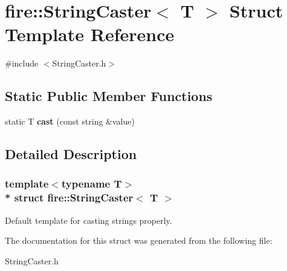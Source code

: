 \hypertarget{a00029}{}\section{fire\+:\+:String\+Caster$<$ T $>$ Struct Template Reference}
\label{a00029}


{\ttfamily \#include $<$String\+Caster.\+h$>$}

\subsection*{Static Public Member Functions}
\begin{DoxyCompactItemize}
\item 
static T {\bfseries cast} (const string \&value)\hypertarget{a00029_a2f87754c1c9d5cfe64acebbaafddbbae}{}\label{a00029_a2f87754c1c9d5cfe64acebbaafddbbae}

\end{DoxyCompactItemize}


\subsection{Detailed Description}
\subsubsection*{template$<$typename T$>$\\*
struct fire\+::\+String\+Caster$<$ T $>$}

Default template for casting strings properly. 

The documentation for this struct was generated from the following file\+:\begin{DoxyCompactItemize}
\item 
String\+Caster.\+h\end{DoxyCompactItemize}
